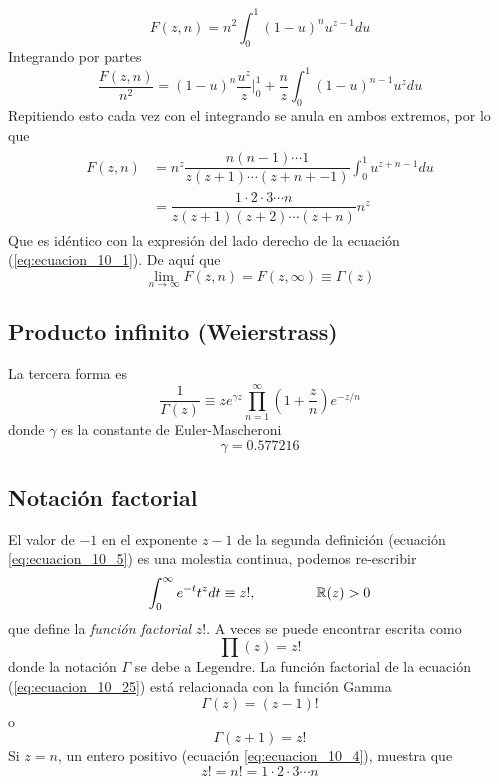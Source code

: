 \begin{equation}
F(z,n) = n^{2} \int_{0}^{1} (1-u)^{n} u^{z-1} du
\label{eq:ecuacione_10_12}
\end{equation}
Integrando por partes
\begin{equation}
\dfrac{F(z,n)}{n^{2}} =  (1-u)^{n} \dfrac{u^{z}}{z} \Bigg\vert_{0}^{1} + \dfrac{n}{z} \int_{0}^{1} (1-u)^{n-1} u^{z} du
\label{eq:ecuacion_10_13}
\end{equation}
Repitiendo esto cada vez con el integrando se anula en ambos extremos, por lo que
\begin{eqnarray}
\begin{aligned}
F(z,n) &= n^{z} \dfrac{n(n-1) \cdots 1}{z(z+1) \cdots (z+n+-1)} \int_{0}^{1} u^{z+n-1} du \\
&= \dfrac{1 \cdot 2 \cdot 3 \cdots n}{z(z+1)(z+2) \cdots (z+n)} n^{z}
\label{eq:ecuacion_10_14}
\end{aligned}
\end{eqnarray}
Que es idéntico con la expresión del lado derecho de la ecuación (\ref{eq:ecuacion_10_1}). De aquí que
\begin{equation}
\lim_{n \to \infty} F(z,n) = F(z,\infty) \equiv \Gamma (z)
\label{eq:ecuacion_10_15}
\end{equation}
\subsection{Producto infinito (Weierstrass)}
La tercera forma es
\begin{equation}
\dfrac{1}{\Gamma (z)} \equiv z e^{\gamma z} \prod_{n=1}^{\infty} \left( 1 + \dfrac{z}{n} \right) e^{-z/n}
\label{eq:ecuacion_10_16}
\end{equation}
donde $\gamma$ es la constante de Euler-Mascheroni
\begin{equation}
\gamma = 0.577216
\label{eq:ecuacion_10_17}
\end{equation}
\subsection{Notación factorial}
El valor de $-1$ en el exponente $z-1$ de la segunda definición (ecuación \ref{eq:ecuacion_10_5}) es una molestia continua, podemos re-escribir
\begin{equation}
\int_{0}^{\infty} e^{-t} t^{z} dt \equiv z!,  \hspace{1.5cm} \mathbb{R}(z) > 0
\label{eq:ecuacion_10_25}
\end{equation}
que define la \emph{función factorial} $z!$. A veces se puede encontrar escrita como
\begin{equation}
\prod(z) = z!
\end{equation}
donde la notación $\Gamma$ se debe a Legendre. La función factorial de la ecuación (\ref{eq:ecuacion_10_25}) está relacionada con la función Gamma
\[ \Gamma (z) = (z-1)! \]
o
\begin{equation}
\Gamma (z+1) = z!
\label{eq:ecuacion_10_27}
\end{equation}
Si $z=n$, un entero positivo (ecuación \ref{eq:ecuacion_10_4}), muestra que
\begin{equation}
z! = n! = 1 \cdot 2 \cdot 3 \cdots n
\label{eq:ecuacion_10_28}
\end{equation}
